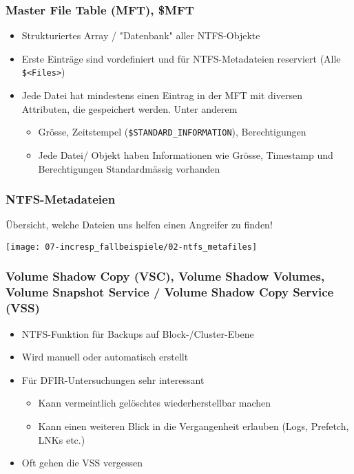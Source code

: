 \subsubsection{Master File Table (MFT), \$MFT}
\begin{itemize}
    \item Strukturiertes Array / "Datenbank" aller NTFS-Objekte
    \item Erste Einträge sind vordefiniert und für NTFS-Metadateien reserviert (Alle \lstinline|$<Files>|)
    \item Jede Datei hat mindestens einen Eintrag in der MFT mit diversen Attributen, die gespeichert werden. Unter anderem
    \begin{itemize}
        \item Grösse, Zeitstempel (\lstinline|$STANDARD_INFORMATION|), Berechtigungen
        \item Jede Datei/ Objekt haben Informationen wie Grösse, Timestamp und Berechtigungen Standardmässig vorhanden
    \end{itemize}
\end{itemize}

\subsubsection{NTFS-Metadateien}
Übersicht, welche Dateien uns helfen einen Angreifer zu finden!
\begin{center}
    \texttt{[image: 07-incresp\_fallbeispiele/02-ntfs\_metafiles]}
\end{center}

\subsubsection{Volume Shadow Copy (VSC), Volume Shadow Volumes, Volume Snapshot Service / Volume Shadow Copy Service (VSS)}
\begin{itemize}
    \item NTFS-Funktion für Backups auf Block-/Cluster-Ebene
    \item Wird manuell oder automatisch erstellt
    \item Für DFIR-Untersuchungen sehr interessant
    \begin{itemize}
        \item Kann vermeintlich gelöschtes wiederherstellbar machen
        \item Kann einen weiteren Blick in die Vergangenheit erlauben (Logs, Prefetch, LNKs etc.)
    \end{itemize}
    \item Oft gehen die VSS vergessen
\end{itemize}

